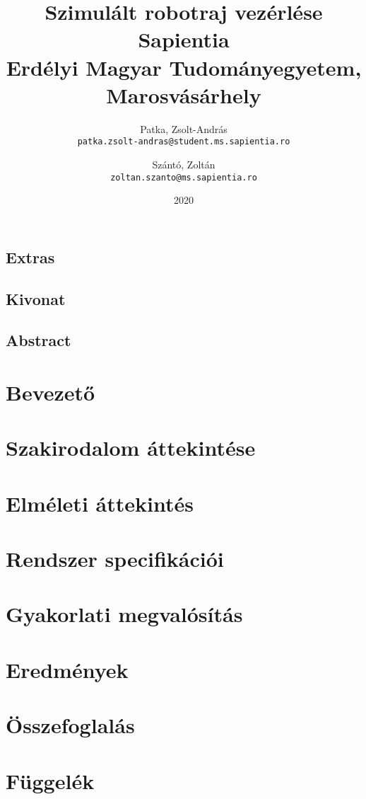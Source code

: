 \documentclass[12pt, twosides]{report}
\title{
	{Szimulált robotraj vezérlése}\\
	{\large Sapientia\\
	Erdélyi Magyar Tudományegyetem, Marosvásárhely}
}
\author{
	Patka, Zsolt-András\\
	\texttt{patka.zsolt-andras@student.ms.sapientia.ro}
	\and
	Szántó, Zoltán\\
	\texttt{zoltan.szanto@ms.sapientia.ro}	
}
\date{2020}
\begin{document}


\section*{Extras}

\pagebreak



\section*{Kivonat}

\pagebreak

\section*{Abstract}

\pagebreak


\tableofcontents

\listoffigures

\chapter{Bevezető}


\chapter{Szakirodalom áttekintése}


\chapter{Elméleti áttekintés}


\chapter{Rendszer specifikációi}


\chapter{Gyakorlati megvalósítás} \label{chpt:implementation}


\chapter{Eredmények}


\chapter{Összefoglalás}





\appendix
\chapter{Függelék}

\end{document}
